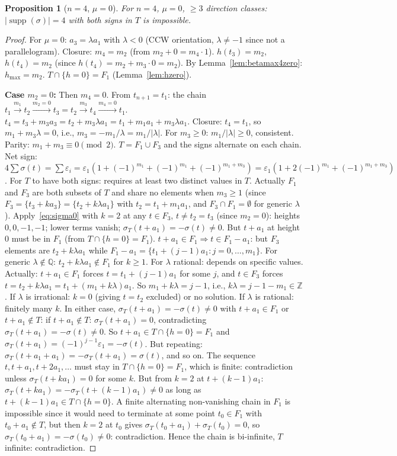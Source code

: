 \documentclass{article}
\newtheorem{prop}{Proposition}
\begin{document}
\begin{prop}[$n=4$, $\mu=0$]\label{prop:n4mu0}
For $n=4$, $\mu=0$, $\ge 3$ direction classes:
$|\operatorname{supp}(\sigma)|=4$ with both signs in $T$ is impossible.
\end{prop}
\begin{proof}
For $\mu=0$: $a_3=\lambda a_1$ with $\lambda<0$ (CCW orientation, $\lambda\ne -1$ since not a parallelogram).
Closure: $m_4=m_2$ (from $m_2+0=m_4\cdot 1$).
$h(t_3)=m_2$, $h(t_4)=m_2$ (since $h(t_4)=m_2+m_3\cdot 0=m_2$).
By Lemma~\ref{lem:betamax4zero}: $h_{\max}=m_2$.
$T\cap\{h=0\}=F_1$ (Lemma~\ref{lem:hzero}).

\textbf{Case $m_2=0$:}
Then $m_4=0$. From $t_{n+1}=t_1$: the chain $t_1\xrightarrow{m_1}t_2\xrightarrow{m_2=0}t_3=t_2\xrightarrow{m_3}t_4\xrightarrow{m_4=0}t_1$.
$t_4=t_3+m_3a_3=t_2+m_3\lambda a_1=t_1+m_1a_1+m_3\lambda a_1$.  Closure: $t_4=t_1$, so $m_1+m_3\lambda=0$, i.e., $m_3=-m_1/\lambda=m_1/|\lambda|$.  For $m_3\ge 0$: $m_1/|\lambda|\ge 0$, consistent.  Parity: $m_1+m_3\equiv 0\pmod 2$.
$T=F_1\cup F_3$ and the signs alternate on each chain.
Net sign: $4\sum\sigma(t)=\sum\varepsilon_i=\varepsilon_1(1+(-1)^{m_1}+(-1)^{m_1}+(-1)^{m_1+m_3})=\varepsilon_1(1+2(-1)^{m_1}+(-1)^{m_1+m_3})$.
For $T$ to have both signs: requires at least two distinct values in $T$.
Actually $F_1$ and $F_3$ are both subsets of $T$ and share no elements when $m_3\ge 1$ (since $F_3=\{t_3+ka_3\}=\{t_2+k\lambda a_1\}$ with $t_2=t_1+m_1a_1$, and $F_3\cap F_1=\emptyset$ for generic $\lambda$).
Apply~\eqref{eq:sigma0} with $k=2$ at any $t\in F_3$, $t\ne t_2=t_3$ (since $m_2=0$):
heights $0,0,-1,-1$; lower terms vanish; $\sigma_T(t+a_1)=-\sigma(t)\ne 0$.
But $t+a_1$ at height $0$ must be in $F_1$ (from $T\cap\{h=0\}=F_1$).
$t+a_1\in F_1\Rightarrow t\in F_1-a_1$: but $F_3$ elements are $t_2+k\lambda a_1$ while $F_1-a_1=\{t_1+(j-1)a_1:j=0,\dots,m_1\}$. For generic $\lambda\notin\mathbb{Q}$: $t_2+k\lambda a_1\notin F_1$ for $k\ge 1$. For $\lambda$ rational: depends on specific values.
Actually: $t+a_1\in F_1$ forces $t=t_1+(j-1)a_1$ for some $j$, and $t\in F_3$ forces $t=t_2+k\lambda a_1=t_1+(m_1+k\lambda)a_1$. So $m_1+k\lambda=j-1$, i.e., $k\lambda=j-1-m_1\in\mathbb{Z}$.
If $\lambda$ is irrational: $k=0$ (giving $t=t_2$ excluded) or no solution.
If $\lambda$ is rational: finitely many $k$.  In either case, $\sigma_T(t+a_1)=-\sigma(t)\ne 0$ with $t+a_1\in F_1$ or $t+a_1\notin T$:
if $t+a_1\notin T$: $\sigma_T(t+a_1)=0$, contradicting $\sigma_T(t+a_1)=-\sigma(t)\ne 0$.
So $t+a_1\in T\cap\{h=0\}=F_1$ and $\sigma_T(t+a_1)=(-1)^{j-1}\varepsilon_1=-\sigma(t)$.
But repeating: $\sigma_T(t+a_1+a_1)=-\sigma_T(t+a_1)=\sigma(t)$, and so on.  The sequence $t,t+a_1,t+2a_1,\dots$ must stay in $T\cap\{h=0\}=F_1$, which is finite: contradiction unless $\sigma_T(t+ka_1)=0$ for some $k$.  But from $k=2$ at $t+(k-1)a_1$: $\sigma_T(t+ka_1)=-\sigma_T(t+(k-1)a_1)\ne 0$ as long as $t+(k-1)a_1\in T\cap\{h=0\}$.  A finite alternating non-vanishing chain in $F_1$ is impossible since it would need to terminate at some point $t_0\in F_1$ with $t_0+a_1\notin T$, but then $k=2$ at $t_0$ gives $\sigma_T(t_0+a_1)+\sigma_T(t_0)=0$, so $\sigma_T(t_0+a_1)=-\sigma(t_0)\ne 0$: contradiction.  Hence the chain is bi-infinite, $T$ infinite: contradiction.


\end{proof}
\end{document}
